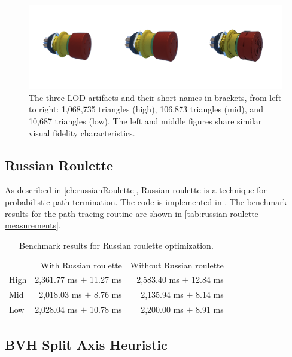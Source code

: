 \begin{figure}[H]
    \centering
    \includegraphics[width=0.9\columnwidth]{resources/benchmark-models.png}
    \caption{The three \gls{LOD} artifacts and their short names in brackets, from left to right: 1,068,735 triangles (high), 106,873 triangles (mid), and 10,687 triangles (low). The left and middle figures share similar visual fidelity characteristics.}
    \label{fig:benchmark-models}
\end{figure}

\subsection*{Russian Roulette}

As described in \autoref{ch:russianRoulette}, Russian roulette is a technique for probabilistic path termination. The code is implemented in . The benchmark results for the path tracing routine are shown in \autoref{tab:russian-roulette-measurements}.

\begin{table}[H]
    \centering
    \begin{tabular}{@{}lrr@{}}
        \toprule
             & With Russian roulette      & Without Russian roulette   \\
        High & 2,361.77 ms $\pm$ 11.27 ms & 2,583.40 ms $\pm$ 12.84 ms \\
        Mid  & 2,018.03 ms $\pm$ 8.76 ms  & 2,135.94 ms $\pm$ 8.14 ms  \\
        Low  & 2,028.04 ms $\pm$ 10.78 ms & 2,200.00 ms $\pm$ 8.91 ms  \\
        \bottomrule
    \end{tabular}
    \caption{Benchmark results for Russian roulette optimization.}
    \label{tab:russian-roulette-measurements}
\end{table}

\subsection*{BVH Split Axis Heuristic}

